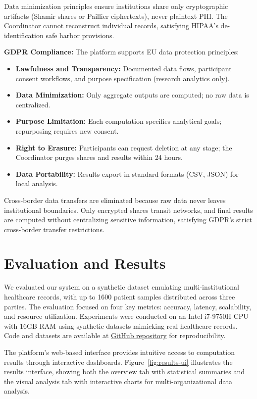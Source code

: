 \documentclass[conference]{IEEEtran}
\begin{document}
Data minimization principles ensure institutions share only cryptographic artifacts (Shamir shares or Paillier ciphertexts), never plaintext PHI. The Coordinator cannot reconstruct individual records, satisfying HIPAA's de-identification safe harbor provisions.

\textbf{GDPR Compliance:} The platform supports EU data protection principles:
\begin{itemize}
    \item \textbf{Lawfulness and Transparency:} Documented data flows, participant consent workflows, and purpose specification (research analytics only).
    \item \textbf{Data Minimization:} Only aggregate outputs are computed; no raw data is centralized.
    \item \textbf{Purpose Limitation:} Each computation specifies analytical goals; repurposing requires new consent.
    \item \textbf{Right to Erasure:} Participants can request deletion at any stage; the Coordinator purges shares and results within 24 hours.
    \item \textbf{Data Portability:} Results export in standard formats (CSV, JSON) for local analysis.
\end{itemize}
Cross-border data transfers are eliminated because raw data never leaves institutional boundaries. Only encrypted shares transit networks, and final results are computed without centralizing sensitive information, satisfying GDPR's strict cross-border transfer restrictions.

\section{Evaluation and Results}
We evaluated our system on a synthetic dataset emulating multi-institutional healthcare records, with up to 1600 patient samples distributed across three parties. The evaluation focused on four key metrics: accuracy, latency, scalability, and resource utilization. Experiments were conducted on an Intel i7-9750H CPU with 16GB RAM using synthetic datasets mimicking real healthcare records. Code and datasets are available at \href{https://github.com/loki4968/PRIVACY-PRESERVING-HEALTH-DATA-EXCHANGE-USING-SECURE-MULTI-PARTY-COMPUTATION}{GitHub repository} for reproducibility.

The platform's web-based interface provides intuitive access to computation results through interactive dashboards. Figure~\ref{fig:results-ui} illustrates the results interface, showing both the overview tab with statistical summaries and the visual analysis tab with interactive charts for multi-organizational data analysis.
\end{document}
